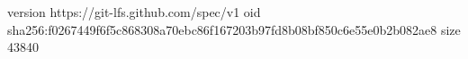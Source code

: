 version https://git-lfs.github.com/spec/v1
oid sha256:f0267449f6f5c868308a70ebc86f167203b97fd8b08bf850c6e55e0b2b082ae8
size 43840
